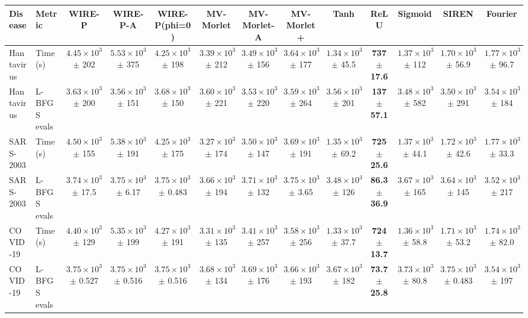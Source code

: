 \begin{tabular}{llccccccccccc}
\toprule
Disease & Metric & WIRE-P & WIRE-P-A & WIRE-P(phi=0) & MV-Morlet & MV-Morlet-A & MV-Morlet+ & Tanh & ReLU & Sigmoid & SIREN & Fourier \\
\midrule
Hantavirus & Time (s) & $4.45\times10^{3}$ $\pm$ 202 & $5.53\times10^{3}$ $\pm$ 375 & $4.25\times10^{3}$ $\pm$ 198 & $3.39\times10^{3}$ $\pm$ 212 & $3.49\times10^{3}$ $\pm$ 156 & $3.64\times10^{3}$ $\pm$ 177 & $1.34\times10^{3}$ $\pm$ 45.5 & \textbf{737 $\pm$ 17.6} & $1.37\times10^{3}$ $\pm$ 112 & $1.70\times10^{3}$ $\pm$ 56.9 & $1.77\times10^{3}$ $\pm$ 96.7 \\
Hantavirus & L-BFGS evals & $3.63\times10^{3}$ $\pm$ 200 & $3.56\times10^{3}$ $\pm$ 151 & $3.68\times10^{3}$ $\pm$ 150 & $3.60\times10^{3}$ $\pm$ 221 & $3.53\times10^{3}$ $\pm$ 220 & $3.59\times10^{3}$ $\pm$ 264 & $3.56\times10^{3}$ $\pm$ 201 & \textbf{137 $\pm$ 57.1} & $3.48\times10^{3}$ $\pm$ 582 & $3.50\times10^{3}$ $\pm$ 291 & $3.54\times10^{3}$ $\pm$ 184 \\
\midrule
SARS-2003 & Time (s) & $4.50\times10^{3}$ $\pm$ 155 & $5.38\times10^{3}$ $\pm$ 191 & $4.25\times10^{3}$ $\pm$ 175 & $3.27\times10^{3}$ $\pm$ 174 & $3.50\times10^{3}$ $\pm$ 147 & $3.69\times10^{3}$ $\pm$ 191 & $1.35\times10^{3}$ $\pm$ 69.2 & \textbf{725 $\pm$ 25.6} & $1.37\times10^{3}$ $\pm$ 44.1 & $1.72\times10^{3}$ $\pm$ 42.6 & $1.77\times10^{3}$ $\pm$ 33.3 \\
SARS-2003 & L-BFGS evals & $3.74\times10^{3}$ $\pm$ 17.5 & $3.75\times10^{3}$ $\pm$ 6.17 & $3.75\times10^{3}$ $\pm$ 0.483 & $3.66\times10^{3}$ $\pm$ 194 & $3.71\times10^{3}$ $\pm$ 132 & $3.75\times10^{3}$ $\pm$ 3.65 & $3.48\times10^{3}$ $\pm$ 126 & \textbf{86.3 $\pm$ 36.9} & $3.67\times10^{3}$ $\pm$ 165 & $3.64\times10^{3}$ $\pm$ 145 & $3.52\times10^{3}$ $\pm$ 217 \\
\midrule
COVID-19 & Time (s) & $4.40\times10^{3}$ $\pm$ 129 & $5.35\times10^{3}$ $\pm$ 199 & $4.27\times10^{3}$ $\pm$ 191 & $3.31\times10^{3}$ $\pm$ 135 & $3.41\times10^{3}$ $\pm$ 257 & $3.58\times10^{3}$ $\pm$ 256 & $1.33\times10^{3}$ $\pm$ 37.7 & \textbf{724 $\pm$ 13.7} & $1.36\times10^{3}$ $\pm$ 58.8 & $1.71\times10^{3}$ $\pm$ 53.2 & $1.74\times10^{3}$ $\pm$ 82.0 \\
COVID-19 & L-BFGS evals & $3.75\times10^{3}$ $\pm$ 0.527 & $3.75\times10^{3}$ $\pm$ 0.516 & $3.75\times10^{3}$ $\pm$ 0.516 & $3.68\times10^{3}$ $\pm$ 134 & $3.69\times10^{3}$ $\pm$ 176 & $3.66\times10^{3}$ $\pm$ 193 & $3.67\times10^{3}$ $\pm$ 182 & \textbf{73.7 $\pm$ 25.8} & $3.73\times10^{3}$ $\pm$ 80.8 & $3.75\times10^{3}$ $\pm$ 0.483 & $3.54\times10^{3}$ $\pm$ 197 \\
\bottomrule
\end{tabular}